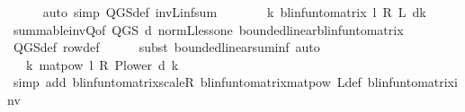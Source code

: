 \begin{isabellebody}
\ \ \ \ \isamarkupfalse%
\ {\isacharparenleft}{\kern0pt}auto\ simp{\isacharcolon}{\kern0pt}\ Q{\isacharunderscore}{\kern0pt}GS{\isacharunderscore}{\kern0pt}def\ inv\isactrlsub L{\isacharunderscore}{\kern0pt}inf{\isacharunderscore}{\kern0pt}sum{\isacharparenright}{\kern0pt}\isanewline
\ \ \isamarkupfalse%
\ \isamarkupfalse%
\ {\isachardoublequoteopen}{\isasymdots}\ {\isacharequal}{\kern0pt}\ {\isacharparenleft}{\kern0pt}{\isasymSum}k{\isachardot}{\kern0pt}\ {\isacharparenleft}{\kern0pt}blinfun{\isacharunderscore}{\kern0pt}to{\isacharunderscore}{\kern0pt}matrix\ {\isacharparenleft}{\kern0pt}{\isacharparenleft}{\kern0pt}l\ {\isacharasterisk}{\kern0pt}\isactrlsub R\ {\isasymP}\isactrlsub L\ d{\isacharparenright}{\kern0pt}{\isacharcircum}{\kern0pt}{\isacharcircum}{\kern0pt}k{\isacharparenright}{\kern0pt}{\isacharparenright}{\kern0pt}{\isacharparenright}{\kern0pt}{\isachardoublequoteclose}\isanewline
\ \ \ \ \isamarkupfalse%
\ summable{\isacharunderscore}{\kern0pt}inv{\isacharunderscore}{\kern0pt}Q{\isacharbrackleft}{\kern0pt}of\ {\isachardoublequoteopen}Q{\isacharunderscore}{\kern0pt}GS\ d{\isachardoublequoteclose}{\isacharbrackright}{\kern0pt}\ norm{\isacharunderscore}{\kern0pt}{\isasymP}\isactrlsub L{\isacharunderscore}{\kern0pt}less{\isacharunderscore}{\kern0pt}one\ bounded{\isacharunderscore}{\kern0pt}linear{\isacharunderscore}{\kern0pt}blinfun{\isacharunderscore}{\kern0pt}to{\isacharunderscore}{\kern0pt}matrix\isanewline
\ \ \ \ \isamarkupfalse%
\ Q{\isacharunderscore}{\kern0pt}GS{\isacharunderscore}{\kern0pt}def\ row{\isacharunderscore}{\kern0pt}def\isanewline
\ \ \ \ \isamarkupfalse%
\ {\isacharparenleft}{\kern0pt}subst\ bounded{\isacharunderscore}{\kern0pt}linear{\isachardot}{\kern0pt}suminf{\isacharparenright}{\kern0pt}\ auto\isanewline
\ \ \isamarkupfalse%
\ \isamarkupfalse%
\ {\isachardoublequoteopen}{\isasymdots}\ {\isacharequal}{\kern0pt}\ {\isacharparenleft}{\kern0pt}{\isasymSum}k{\isachardot}{\kern0pt}\ {\isacharparenleft}{\kern0pt}matpow\ {\isacharparenleft}{\kern0pt}l\ {\isacharasterisk}{\kern0pt}\isactrlsub R\ {\isacharparenleft}{\kern0pt}P{\isacharunderscore}{\kern0pt}lower\ d{\isacharparenright}{\kern0pt}{\isacharparenright}{\kern0pt}\ k{\isacharparenright}{\kern0pt}{\isacharparenright}{\kern0pt}{\isachardoublequoteclose}\isanewline
\ \ \ \ \isamarkupfalse%
\ {\isacharparenleft}{\kern0pt}simp\ add{\isacharcolon}{\kern0pt}\ blinfun{\isacharunderscore}{\kern0pt}to{\isacharunderscore}{\kern0pt}matrix{\isacharunderscore}{\kern0pt}scaleR\ blinfun{\isacharunderscore}{\kern0pt}to{\isacharunderscore}{\kern0pt}matrix{\isacharunderscore}{\kern0pt}matpow\ {\isasymP}\isactrlsub L{\isacharunderscore}{\kern0pt}def\ blinfun{\isacharunderscore}{\kern0pt}to{\isacharunderscore}{\kern0pt}matrix{\isacharunderscore}{\kern0pt}inv{\isacharparenright}{\kern0pt}\isanewline

\end{isabellebody}
